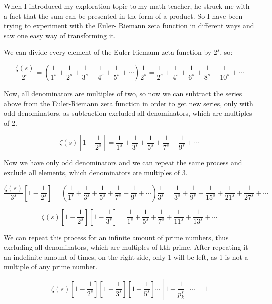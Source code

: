 \documentclass[a4paper]{article}
\begin{document}
When I introduced my exploration topic to my math teacher, he struck me with a
fact that the sum can be presented in the form of a product. So I have been
trying to experiment with the Euler- Riemann zeta function in different ways and
saw one easy way of transforming it. 

We can divide every element of the Euler-Riemann zeta function by \(2^s\), so:

\begin{equation*}
  \frac{\zeta(s)}{2^s}= (\frac{1}{1^s}+\frac{1}{2^s}+\frac{1}{3^s}+
  \frac{1}{4^s}+\frac{1}{5^s}+\cdots)\frac{1}{2^s}=
  \frac{1}{2^s}+\frac{1}{4^s}+\frac{1}{6^s}+
  \frac{1}{8^s}+\frac{1}{10^s}+\cdots
  \end{equation*}

Now, all denominators are multiples of two, so now we can subtract the series
above from the Euler-Riemann zeta function in order to get new series, only with
odd denominators, as subtraction excluded all denominators, which are multiples
of 2. 

\begin{equation*}
  \zeta(s)[1-\frac{1}{2^s}]=\frac{1}{1^s}+\frac{1}{3^s}+\frac{1}{5^s}+
  \frac{1}{7^s}+\frac{1}{9^s}+\cdots
  \end{equation*}

Now we have only odd denominators and we can repeat the same process and exclude
all elements, which denominators are multiples of 3.

\begin{equation*}
  \frac{\zeta(s)}{3^s}[1-\frac{1}{2^s}] = (\frac{1}{1^s}+\frac{1}{3^s}+\frac{1}{5^s}+
  \frac{1}{7^s}+\frac{1}{9^s}+\cdots)\frac{1}{3^s}=\frac{1}{3^s}+\frac{1}{9^s}+\frac{1}{15^s}+
  \frac{1}{21^s}+\frac{1}{27^s}+\cdots
\end{equation*}

\begin{equation*}
  \zeta(s)[1-\frac{1}{2^s}][1-\frac{1}{3^s}] = \frac{1}{1^s}+\frac{1}{5^s}+\frac{1}{7^s}+
  \frac{1}{11^s}+\frac{1}{13^s}+\cdots
  \end{equation*}

We can repeat this process for an infinite amount of prime numbers, thus
excluding all denominators, which are multiples of kth prime. After repeating it
an indefinite amount of times, on the right side, only 1 will be left, as 1 is
not a multiple of any prime number. 

\begin{equation*}
  \zeta(s)[1-\frac{1}{2^s}][1-\frac{1}{3^s}][1-\frac{1}{5^s}]\cdots[1-\frac{1}{p_k^s}]\cdots=1
  \end{equation*}
\end{document}
